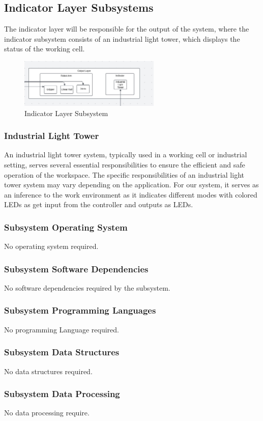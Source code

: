 \subsection{Indicator Layer Subsystems}
The indicator layer will be responsible for the output of the system, where the indicator subsystem
consists of an industrial light tower, which displays the status of the working cell.

\begin{figure}[h!]
	\centering
 	\includegraphics[width=0.60\textwidth]{images/indicator.jpg}
 \caption{Indicator Layer Subsystem}
\end{figure}

\subsubsection{Industrial Light Tower}
An industrial light tower system, typically used in a working cell or industrial setting, serves several
essential responsibilities to ensure the efficient and safe operation of the workspace. The specific responsibilities of an industrial light tower system may vary depending on the application. For our system,
it serves as an inference to the work environment as it indicates different modes with colored LEDs as
get input from the controller and outputs as LEDs.

\subsubsection{Subsystem Operating System}
No operating system required. 

\subsubsection{Subsystem Software Dependencies}
No software dependencies required by the subsystem.

\subsubsection{Subsystem Programming Languages}
No programming Language required.

\subsubsection{Subsystem Data Structures}
No data structures required. 

\subsubsection{Subsystem Data Processing}
No data processing require.


